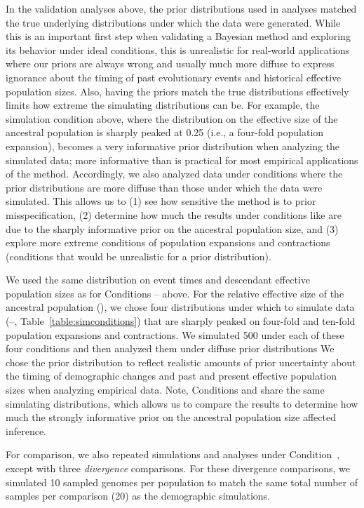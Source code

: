 In the validation analyses above, the prior distributions used in analyses
matched the true underlying distributions under which the data were generated.
While this is an important first step when validating a Bayesian method
and exploring its behavior under ideal conditions,
this is unrealistic for real-world applications
where our priors are always wrong and usually much more diffuse to express
ignorance about the timing of past evolutionary events and historical effective
population sizes.
Also, having the priors match the true distributions effectively
limits how extreme the simulating distributions can be.
For example, the simulation condition \vsimfourinc above, where the
distribution on the effective size of the ancestral population is sharply
peaked at 0.25 (i.e., a four-fold population expansion), becomes a very
informative prior distribution when analyzing the simulated data;
more informative than is practical for most empirical applications of the
method.
Accordingly, we also analyzed data under conditions where the prior
distributions are more diffuse than those under which the data were simulated.
This allows us to
(1) see how sensitive the method is to prior misspecification,
(2) determine how much the results under conditions like \vsimfourinc are
due to the sharply informative prior on the ancestral population size,
and
(3) explore more extreme conditions of population expansions and contractions
(conditions that would be unrealistic for a prior distribution).

We used the same distribution on event times and descendant effective
population sizes as for Conditions --
above.
For the relative effective size of the ancestral population
(\rootrelativepopsize), we chose four distributions under which to simulate
data
(--, Table~\ref{table:simconditions})
that are sharply peaked on four-fold and ten-fold population
expansions and contractions.
We simulated 500 \datasets under each of these four conditions and then
analyzed them under diffuse prior distributions
We chose the prior distribution to reflect realistic amounts of prior
uncertainty about the timing of demographic changes and past and present
effective population sizes when analyzing empirical data.
Note, Conditions \vsimfourinc and \msimfourinc share the same simulating
distributions, which allows us to compare the results to determine how much the
strongly informative prior on the ancestral population size affected inference.

For comparison, we also repeated simulations and analyses under
Condition~\vsimfourinc, except with three \emph{divergence} comparisons.
For these divergence comparisons, we simulated 10 sampled genomes per
population to match the same total number of samples per comparison (20) as the
demographic simulations.


